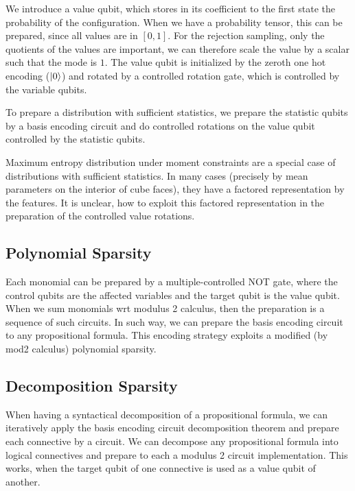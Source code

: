 \documentclass[aps,onecolumn,nofootinbib,pra]{article}
\begin{document}
    We introduce a value qubit, which stores in its coefficient to the first state the probability of the configuration.
    When we have a probability tensor, this can be prepared, since all values are in $[0,1]$.
    For the rejection sampling, only the quotients of the values are important, we can therefore scale the value by a scalar such that the mode is $1$.
    The value qubit is initialized by the zeroth one hot encoding ($\ket{0}$) and rotated by a controlled rotation gate, which is controlled by the variable qubits.

    To prepare a distribution with sufficient statistics, we prepare the statistic qubits by a basis encoding circuit and do controlled rotations on the value qubit controlled by the statistic qubits.

    Maximum entropy distribution under moment constraints are a special case of distributions with sufficient statistics.
    In many cases (precisely by mean parameters on the interior of cube faces), they have a factored representation by the features.
    It is unclear, how to exploit this factored representation in the preparation of the controlled value rotations.

    \subsection{Polynomial Sparsity}

    Each monomial can be prepared by a multiple-controlled NOT gate, where the control qubits are the affected variables and the target qubit is the value qubit.
    When we sum monomials wrt modulus 2 calculus, then the preparation is a sequence of such circuits.
    In such way, we can prepare the basis encoding circuit to any propositional formula.
    This encoding strategy exploits a modified (by mod2 calculus) polynomial sparsity.

    \subsection{Decomposition Sparsity}

    When having a syntactical decomposition of a propositional formula, we can iteratively apply the basis encoding circuit decomposition theorem and prepare each connective by a circuit.
    We can decompose any propositional formula into logical connectives and prepare to each a modulus 2 circuit implementation.
    This works, when the target qubit of one connective is used as a value qubit of another.
\end{document}
